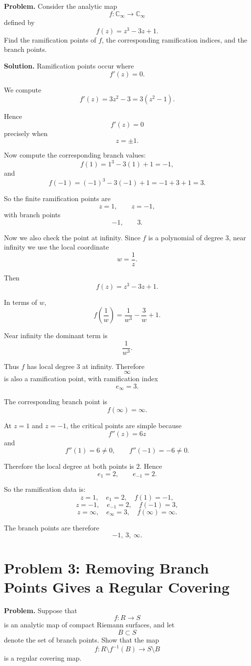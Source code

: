 \documentclass[12pt,a4paper]{article}
\theoremstyle{notespace}
\begin{document}
\textbf{Problem.}
Consider the analytic map
\[
f:\mathbb C_\infty\to\mathbb C_\infty
\]
defined by
\[
f(z)=z^3-3z+1.
\]
Find the ramification points of \(f\), the corresponding ramification indices, and the branch points.

\textbf{Solution.}
Ramification points occur where
\[
f'(z)=0.
\]

We compute
\[
f'(z)=3z^2-3=3(z^2-1).
\]

Hence
\[
f'(z)=0
\]
precisely when
\[
z=\pm 1.
\]

Now compute the corresponding branch values:
\[
f(1)=1^3-3(1)+1=-1,
\]
and
\[
f(-1)=(-1)^3-3(-1)+1=-1+3+1=3.
\]

So the finite ramification points are
\[
z=1,\qquad z=-1,
\]
with branch points
\[
-1,\qquad 3.
\]

Now we also check the point at infinity. Since \(f\) is a polynomial of degree \(3\), near infinity we use the local coordinate
\[
w=\frac{1}{z}.
\]

Then
\[
f(z)=z^3-3z+1.
\]

In terms of \(w\),
\[
f\left(\frac{1}{w}\right)=\frac{1}{w^3}-\frac{3}{w}+1.
\]

Near infinity the dominant term is
\[
\frac{1}{w^3}.
\]

Thus \(f\) has local degree \(3\) at infinity. Therefore
\[
\infty
\]
is also a ramification point, with ramification index
\[
e_\infty=3.
\]

The corresponding branch point is
\[
f(\infty)=\infty.
\]

At \(z=1\) and \(z=-1\), the critical points are simple because
\[
f''(z)=6z
\]
and
\[
f''(1)=6\neq 0,\qquad f''(-1)=-6\neq 0.
\]

Therefore the local degree at both points is \(2\). Hence
\[
e_1=2,\qquad e_{-1}=2.
\]

So the ramification data is:
\[
z=1,\quad e_1=2,\quad f(1)=-1,
\]
\[
z=-1,\quad e_{-1}=2,\quad f(-1)=3,
\]
\[
z=\infty,\quad e_\infty=3,\quad f(\infty)=\infty.
\]

The branch points are therefore
\[
\boxed{-1,\ 3,\ \infty}.
\]

\section{Problem 3: Removing Branch Points Gives a Regular Covering}

\textbf{Problem.}
Suppose that
\[
f:R\to S
\]
is an analytic map of compact Riemann surfaces, and let
\[
B\subset S
\]
denote the set of branch points. Show that the map
\[
f:R\setminus f^{-1}(B)\to S\setminus B
\]
is a regular covering map.
\end{document}
